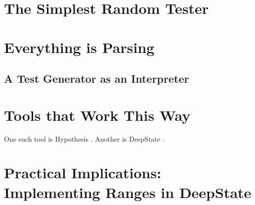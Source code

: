 \documentclass[sigplan,review]{acmart}
\begin{document}
\section{The Simplest Random Tester}

\section{Everything is Parsing}

\subsection{A Test Generator as an Interpreter}

\section{Tools that Work This Way}

One such tool is Hypothesis \cite{hypothesis}.  Another is DeepState \cite{DeepState}.

\section{Practical Implications:  Implementing Ranges in DeepState}






% 
\end{document}
